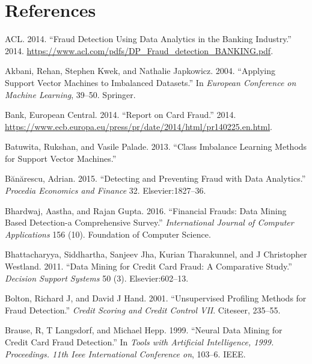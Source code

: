 \documentclass[12pt,]{article}
\begin{document}
\clearpage

\hypertarget{references}{%
\section*{References}\label{references}}

\hypertarget{refs}{}
\leavevmode\hypertarget{ref-fraudanalyticsacl}{}%
ACL. 2014. ``Fraud Detection Using Data Analytics in the Banking
Industry.'' 2014.
\url{https://www.acl.com/pdfs/DP_Fraud_detection_BANKING.pdf}.

\leavevmode\hypertarget{ref-akbani2004applying}{}%
Akbani, Rehan, Stephen Kwek, and Nathalie Japkowicz. 2004. ``Applying
Support Vector Machines to Imbalanced Datasets.'' In \emph{European
Conference on Machine Learning}, 39--50. Springer.

\leavevmode\hypertarget{ref-ecb_fraud}{}%
Bank, European Central. 2014. ``Report on Card Fraud.'' 2014.
\url{https://www.ecb.europa.eu/press/pr/date/2014/html/pr140225.en.html}.

\leavevmode\hypertarget{ref-batuwita2013class}{}%
Batuwita, Rukshan, and Vasile Palade. 2013. ``Class Imbalance Learning
Methods for Support Vector Machines.''

\leavevmode\hypertarget{ref-buanuarescu2015detecting}{}%
Bănărescu, Adrian. 2015. ``Detecting and Preventing Fraud with Data
Analytics.'' \emph{Procedia Economics and Finance} 32.
Elsevier:1827--36.

\leavevmode\hypertarget{ref-bhardwaj2016financial}{}%
Bhardwaj, Aastha, and Rajan Gupta. 2016. ``Financial Frauds: Data Mining
Based Detection-a Comprehensive Survey.'' \emph{International Journal of
Computer Applications} 156 (10). Foundation of Computer Science.

\leavevmode\hypertarget{ref-bhattacharyya2011data}{}%
Bhattacharyya, Siddhartha, Sanjeev Jha, Kurian Tharakunnel, and J
Christopher Westland. 2011. ``Data Mining for Credit Card Fraud: A
Comparative Study.'' \emph{Decision Support Systems} 50 (3).
Elsevier:602--13.

\leavevmode\hypertarget{ref-bolton2001unsupervised}{}%
Bolton, Richard J, and David J Hand. 2001. ``Unsupervised Profiling
Methods for Fraud Detection.'' \emph{Credit Scoring and Credit Control
VII}. Citeseer, 235--55.

\leavevmode\hypertarget{ref-brause1999neural}{}%
Brause, R, T Langsdorf, and Michael Hepp. 1999. ``Neural Data Mining for
Credit Card Fraud Detection.'' In \emph{Tools with Artificial
Intelligence, 1999. Proceedings. 11th Ieee International Conference on},
103--6. IEEE.
\end{document}
